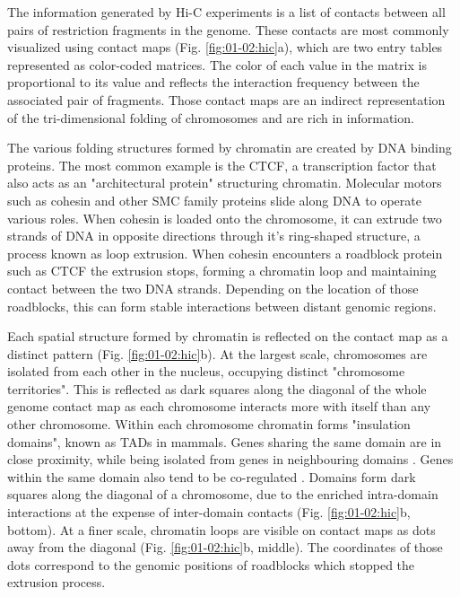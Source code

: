 The information generated by Hi-C experiments is a list of contacts between all pairs of restriction fragments in the genome. These contacts are most commonly visualized using contact maps (Fig. \ref{fig:01-02:hic}a), which are two entry tables represented as color-coded matrices. The color of each value in the matrix is proportional to its value and reflects the interaction frequency between the associated pair of fragments. Those contact maps are an indirect representation of the tri-dimensional folding of chromosomes and are rich in information.

The various folding structures formed by chromatin are created by DNA binding proteins. The most common example is the \acrfull{CTCF}, a transcription factor that also acts as an "architectural protein" structuring chromatin. Molecular motors such as cohesin and other \acrfull{SMC} family proteins slide along DNA to operate various roles. When cohesin is loaded onto the chromosome, it can extrude two strands of DNA in opposite directions through it's ring-shaped structure, a process known as loop extrusion. When cohesin encounters a roadblock protein such as \acrshort{CTCF} the extrusion stops, forming a chromatin loop and maintaining contact between the two DNA strands. Depending on the location of those roadblocks, this can form stable interactions between distant genomic regions. 

Each spatial structure formed by chromatin is reflected on the contact map as a distinct pattern (Fig. \ref{fig:01-02:hic}b). At the largest scale, chromosomes are isolated from each other in the nucleus, occupying distinct "chromosome territories". This is reflected as dark squares along the diagonal of the whole genome contact map as each chromosome interacts more with itself than any other chromosome. Within each chromosome chromatin forms "insulation domains", known as \acrfull{TAD}s in mammals. Genes sharing the same domain are in close proximity, while being isolated from genes in neighbouring domains . Genes within the same domain also tend to be co-regulated \cite{Nora2012}. Domains form dark squares along the diagonal of a chromosome, due to the enriched intra-domain interactions at the expense of inter-domain contacts (Fig. \ref{fig:01-02:hic}b, bottom). At a finer scale, chromatin loops are visible on contact maps as dots away from the diagonal (Fig. \ref{fig:01-02:hic}b, middle). The coordinates of those dots correspond to the genomic positions of roadblocks which stopped the extrusion process.

